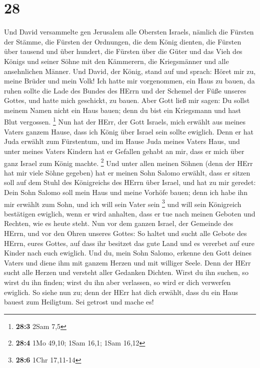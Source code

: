 \hypertarget{section-5}{%
\section{28}\label{section-5}}

 Und David versammelte gen Jerusalem alle Obersten Israels,
nämlich die Fürsten der Stämme, die Fürsten der Ordnungen, die dem König
dienten, die Fürsten über tausend und über hundert, die Fürsten über die
Güter und das Vieh des Königs und seiner Söhne mit den Kämmerern, die
Kriegsmänner und alle ansehnlichen Männer.  Und David, der
König, stand auf und sprach: Höret mir zu, meine Brüder und mein Volk!
Ich hatte mir vorgenommen, ein Haus zu bauen, da ruhen sollte die Lade
des Bundes des HErrn und der Schemel der Füße unseres Gottes, und hatte
mich geschickt, zu bauen.  Aber Gott ließ mir sagen: Du
sollst meinem Namen nicht ein Haus bauen; denn du bist ein Kriegsmann
und hast Blut vergossen. \footnote{\textbf{28:3} 2Sam 7,5} 
Nun hat der HErr, der Gott Israels, mich erwählt aus meines Vaters
ganzem Hause, dass ich König über Israel sein sollte ewiglich. Denn er
hat Juda erwählt zum Fürstentum, und im Hause Juda meines Vaters Haus,
und unter meines Vaters Kindern hat er Gefallen gehabt an mir, dass er
mich über ganz Israel zum König machte. \footnote{\textbf{28:4} 1Mo
  49,10; 1Sam 16,1; 1Sam 16,12}  Und unter allen meinen
Söhnen (denn der HErr hat mir viele Söhne gegeben) hat er meinen Sohn
Salomo erwählt, dass er sitzen soll auf dem Stuhl des Königreichs des
HErrn über Israel,  und hat zu mir geredet: Dein Sohn Salomo
soll mein Haus und meine Vorhöfe bauen; denn ich habe ihn mir erwählt
zum Sohn, und ich will sein Vater sein \footnote{\textbf{28:6} 1Chr
  17,11-14}  und will sein Königreich bestätigen ewiglich,
wenn er wird anhalten, dass er tue nach meinen Geboten und Rechten, wie
es heute steht.  Nun vor dem ganzen Israel, der Gemeinde des
HErrn, und vor den Ohren unseres Gottes: So haltet und sucht alle Gebote
des HErrn, eures Gottes, auf dass ihr besitzet das gute Land und es
vererbet auf eure Kinder nach euch ewiglich.  Und du, mein
Sohn Salomo, erkenne den Gott deines Vaters und diene ihm mit ganzem
Herzen und mit williger Seele. Denn der HErr sucht alle Herzen und
versteht aller Gedanken Dichten. Wirst du ihn suchen, so wirst du ihn
finden; wirst du ihn aber verlassen, so wird er dich verwerfen ewiglich.
 So siehe nun zu; denn der HErr hat dich erwählt, dass du
ein Haus bauest zum Heiligtum. Sei getrost und mache es! 
